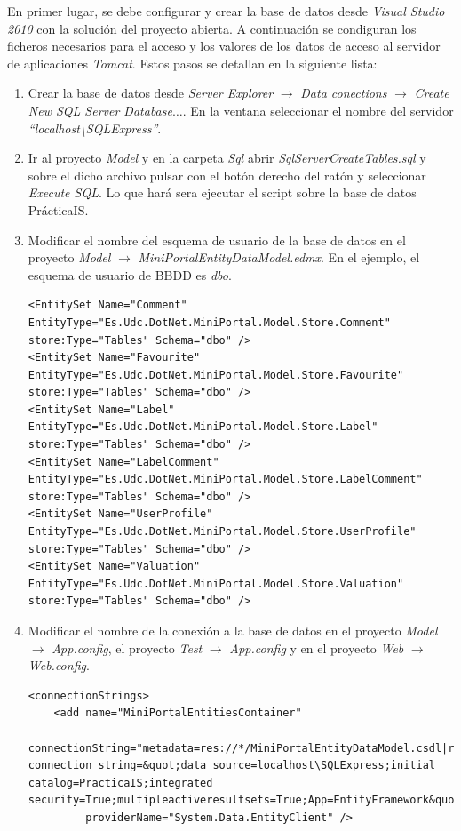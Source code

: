 \documentclass{article}
\begin{document}
	En primer lugar, se debe configurar y crear la base de datos desde \emph{Visual Studio 2010} con la solución del proyecto abierta. A continuación se condiguran los ficheros necesarios para el acceso y los valores de los datos de acceso al servidor de aplicaciones \emph{Tomcat}. Estos pasos se detallan en la siguiente lista:
\begin{enumerate}
	\item Crear la base de datos desde \emph{Server Explorer} $\rightarrow$ \emph{Data conections} $\rightarrow$ \emph{Create New SQL Server Database}$\ldots$. En la ventana seleccionar el nombre del servidor \emph{``localhost\textbackslash SQLExpress''}.
	
	\item Ir al proyecto \emph{Model} y en la carpeta \emph{Sql} abrir \emph{SqlServerCreateTables.sql} y sobre el dicho archivo pulsar con el botón derecho del ratón y seleccionar \emph{Execute SQL}. Lo que hará sera ejecutar el script sobre la base de datos PrácticaIS.
	
	\item Modificar el nombre del esquema de usuario de la base de datos en el proyecto \emph{Model} $\rightarrow$ \emph{MiniPortalEntityDataModel.edmx}. En el ejemplo, el esquema de usuario de BBDD es \emph{dbo}.
\begin{lstlisting}[style=xml]
<EntitySet Name="Comment" EntityType="Es.Udc.DotNet.MiniPortal.Model.Store.Comment" store:Type="Tables" Schema="dbo" />
<EntitySet Name="Favourite" EntityType="Es.Udc.DotNet.MiniPortal.Model.Store.Favourite" store:Type="Tables" Schema="dbo" />
<EntitySet Name="Label" EntityType="Es.Udc.DotNet.MiniPortal.Model.Store.Label" store:Type="Tables" Schema="dbo" />
<EntitySet Name="LabelComment" EntityType="Es.Udc.DotNet.MiniPortal.Model.Store.LabelComment" store:Type="Tables" Schema="dbo" />
<EntitySet Name="UserProfile" EntityType="Es.Udc.DotNet.MiniPortal.Model.Store.UserProfile" store:Type="Tables" Schema="dbo" />
<EntitySet Name="Valuation" EntityType="Es.Udc.DotNet.MiniPortal.Model.Store.Valuation" store:Type="Tables" Schema="dbo" />
\end{lstlisting}

	\item Modificar el nombre de la conexión a la base de datos en el proyecto \emph{Model} $\rightarrow$ \emph{App.config}, el proyecto \emph{Test} $\rightarrow$ \emph{App.config} y en el proyecto \emph{Web} $\rightarrow$ \emph{Web.config}.
\begin{lstlisting}[style=xml]
<connectionStrings>
    <add name="MiniPortalEntitiesContainer"
         connectionString="metadata=res://*/MiniPortalEntityDataModel.csdl|res://*/MiniPortalEntityDataModel.ssdl|res://*/MiniPortalEntityDataModel.msl;provider=System.Data.SqlClient;provider connection string=&quot;data source=localhost\SQLExpress;initial catalog=PracticaIS;integrated security=True;multipleactiveresultsets=True;App=EntityFramework&quot;"
         providerName="System.Data.EntityClient" />


\end{lstlisting}
\end{enumerate}
\end{document}
